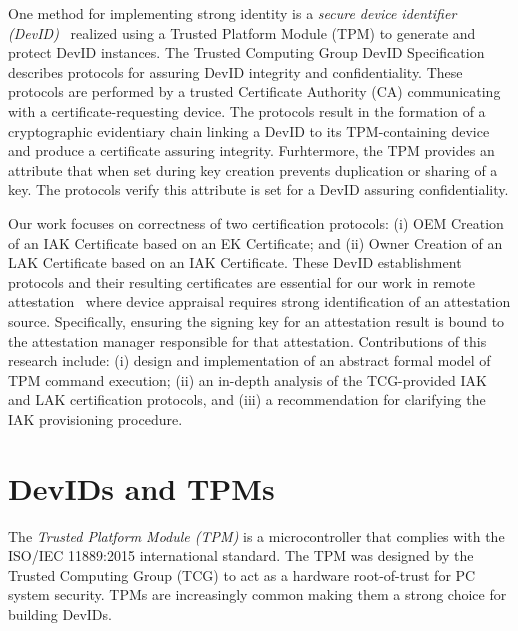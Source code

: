 \documentclass[runningheads]{llncs}
\begin{document}
One method for implementing strong identity is a \emph{secure device
  identifier (DevID)}~\citep{DevIDSpec-IEEE} realized using a Trusted
Platform Module (TPM) to generate and protect DevID instances. 
The Trusted Computing Group DevID Specification~\citep{DevIDSpec-TCG}
describes protocols for assuring DevID integrity and
confidentiality. These protocols are performed by a trusted Certificate 
Authority (CA) communicating with a certificate-requesting device.
The protocols result in the formation of a cryptographic evidentiary chain 
linking a DevID to its TPM-containing device and produce a certificate 
assuring integrity.  Furhtermore, the TPM provides an attribute that when set during 
key creation prevents duplication or sharing of a key.
The protocols verify this attribute is set for a DevID assuring confidentiality.

Our work focuses on correctness of two certification protocols:
(i) OEM Creation of an IAK Certificate based on an EK Certificate; and
(ii) Owner Creation of an LAK Certificate based on an IAK
Certificate. These DevID establishment protocols and their resulting
certificates are essential for our work in remote
attestation~\citep{Coker::Principles-of-R,petz2022innovations} where
device appraisal requires strong identification of an attestation
source. Specifically, ensuring the signing key for an attestation
result is bound to the attestation manager responsible for that
attestation.  Contributions of this research include: (i) design and
implementation of an abstract formal model of TPM command execution;
(ii) an in-depth analysis of the TCG-provided IAK and LAK
certification protocols, and (iii) a recommendation for clarifying the
IAK provisioning procedure.

\section{DevIDs and TPMs}
The \emph{Trusted Platform Module (TPM)} is a microcontroller that complies
with the ISO/IEC 11889:2015 international standard.  The TPM was
designed by the Trusted Computing Group (TCG) to act as a hardware
root-of-trust for PC system security.  TPMs are increasingly common
making them a strong choice for building DevIDs.
\end{document}
